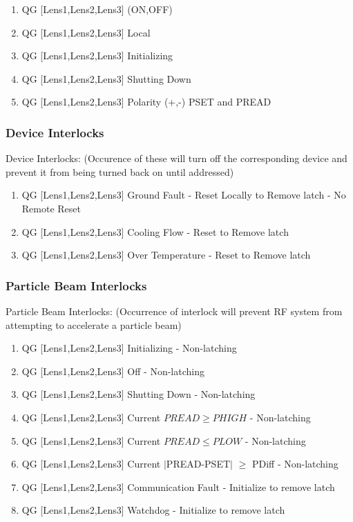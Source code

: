 \documentclass[11pt]{book}		%
\begin{document}
\begin{enumerate}
 \item QG [Lens1,Lens2,Lens3] (ON,OFF)
 \item QG [Lens1,Lens2,Lens3] Local
 \item QG [Lens1,Lens2,Lens3] Initializing
 \item QG [Lens1,Lens2,Lens3] Shutting Down
 \item QG [Lens1,Lens2,Lens3] Polarity (+,-) PSET and PREAD
\end{enumerate}

\subsubsection{Device Interlocks}\label{sect:cyc-op-interface-status-beamline-tofc1-state-monitors-device-interlocks}

Device Interlocks:
(Occurence of these will turn off the corresponding device and prevent it from being turned back on until addressed)

\begin{enumerate}
 \item QG [Lens1,Lens2,Lens3] Ground Fault - Reset Locally to Remove latch - No Remote Reset
 \item QG [Lens1,Lens2,Lens3] Cooling Flow - Reset to Remove latch
 \item QG [Lens1,Lens2,Lens3] Over Temperature - Reset to Remove latch
\end{enumerate}

\subsubsection{Particle Beam Interlocks}\label{sect:cyc-op-interface-status-beamline-tofc1-state-monitors-beam-interlocks}

Particle Beam Interlocks:
(Occurrence of interlock will prevent RF system from attempting to accelerate a particle beam)

\begin{enumerate}
 \item QG [Lens1,Lens2,Lens3] Initializing - Non-latching
 \item QG [Lens1,Lens2,Lens3] Off - Non-latching
 \item QG [Lens1,Lens2,Lens3] Shutting Down - Non-latching
 \item QG [Lens1,Lens2,Lens3] Current $PREAD \geq PHIGH$ - Non-latching
 \item QG [Lens1,Lens2,Lens3] Current $PREAD \leq PLOW$ - Non-latching
 \item QG [Lens1,Lens2,Lens3] Current $\mid$PREAD-PSET$\mid$  $\geq$ PDiff - Non-latching
 \item QG [Lens1,Lens2,Lens3] Communication Fault - Initialize to remove latch
 \item QG [Lens1,Lens2,Lens3] Watchdog - Initialize to remove latch
\end{enumerate}
\end{document}
